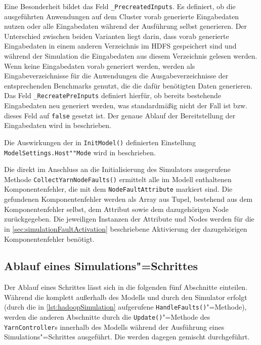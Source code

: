 Eine Besonderheit bildet das Feld \texttt{\_PrecreatedInputs}.
Es definiert, ob die ausgeführten Anwendungen auf dem Cluster vorab generierte Eingabedaten nutzen oder alle Eingabedaten während der Ausführung selbst generieren.
Der Unterschied zwischen beiden Varianten liegt darin, dass vorab generierte Eingabedaten in einem anderen Verzeichnis im \ac{HDFS} gespeichert sind und während der Simulation die Eingabedaten aus diesem Verzeichnis gelesen werden.
Wenn keine Eingabedaten vorab generiert werden, werden als Eingabeverzeichnisse für die Anwendungen die Ausgabeverzeichnisse der entsprechenden Benchmarks genutzt, die die dafür benötigten Daten generieren.
Das Feld \texttt{\_RecreatePreInputs} definiert hierfür, ob bereits bestehende Eingabedaten neu generiert werden, was standardmäßig nicht der Fall ist bzw. dieses Feld auf \texttt{false} gesetzt ist.
Der genaue Ablauf der Bereitstellung der Eingabedaten wird in  beschrieben.

Die Auswirkungen der in \texttt{InitModel()} definierten Einstellung \texttt{ModelSettings.Host""Mode} wird in  beschrieben.

Die direkt im Anschluss an die Initialisierung des Simulators ausgerufene Methode \texttt{CollectYarnNodeFaults()} ermittelt alle im Modell enthaltenen Komponentenfehler, die mit dem \texttt{NodeFaultAttribute} markiert sind.
Die gefundenen Komponentenfehler werden als Array aus Tupel, bestehend aus dem Komponentenfehler selbst, dem Attribut sowie dem dazugehörigen Node zurückgegeben.
Die jeweiligen Instanzen der Attribute und Nodes werden für die in \autoref{sec:simulationFaultActivation} beschriebene Aktivierung der dazugehörigen Komponentenfehler benötigt.

\subsection{Ablauf eines Simulations"=Schrittes}
\label{sec:simulationStep}

Der Ablauf eines Schrittes lässt sich in die folgenden fünf Abschnitte einteilen.
Während die  komplett außerhalb des Modells und durch den Simulator erfolgt (durch die in \autoref{lst:hadoopSimulation} aufgerufene \texttt{HandleFaults()}"=Methode), werden die anderen Abschnitte durch die \texttt{Update()}"=Methode des \texttt{YarnController}s innerhalb des Modells während der Ausführung eines Simulations"=Schrittes ausgeführt.
Die  werden dagegen gemischt durchgeführt.

